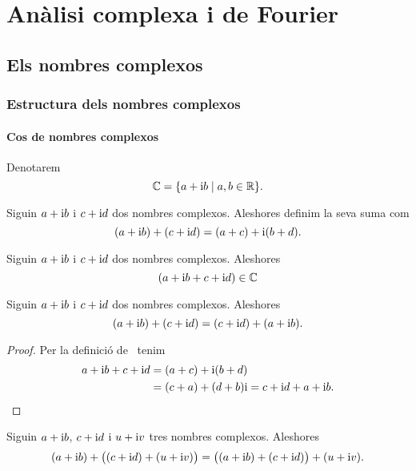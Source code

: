 \documentclass[../Apunts.tex]{subfiles}
\begin{document}
\part{Anàlisi complexa i de Fourier}
\chapter{Els nombres complexos}
\section{Estructura dels nombres complexos}
	\subsection{Cos de nombres complexos}
	\begin{notation}
		\label{notation:cos de nombres complexos}
		Denotarem
		\[\mathbb{C}=\{a+\mathrm{i} b\mid a,b\in\mathbb{R}\}.\]
	\end{notation}
	\begin{definition}
		\label{def:suma de nombres complexos}
		Siguin \(a+\mathrm{i} b\) i \(c+\mathrm{i} d\) dos nombres complexos. Aleshores definim la seva suma com
		\[(a+\mathrm{i} b)+(c+\mathrm{i} d)=(a+c)+\mathrm{i}(b+d).\]
	\end{definition}
	\begin{observation}
		\label{obs:els nombres complexos estan tancats per la suma}
		Siguin \(a+\mathrm{i} b\) i \(c+\mathrm{i} d\) dos nombres complexos. Aleshores
		\[(a+\mathrm{i} b+c+\mathrm{i} d)\in\mathbb{C}\]
	\end{observation}
	\begin{proposition}
		\label{prop:els nombres complexos commuten per la suma}
		\label{prop:el producte de nombres complexos és commutatiu}
		Siguin \(a+\mathrm{i} b\) i \(c+\mathrm{i} d\) dos nombres complexos. Aleshores
		\[(a+\mathrm{i} b)+(c+\mathrm{i} d)=(c+\mathrm{i} d)+(a+\mathrm{i} b).\]
	\end{proposition}
	\begin{proof}
		Per la definició de~ tenim
		\begin{align*}
			a+\mathrm{i} b+c+\mathrm{i} d&=(a+c)+\mathrm{i}(b+d) \\
			&=(c+a)+(d+b)\mathrm{i}=c+\mathrm{i} d+a+\mathrm{i} b.\qedhere
		\end{align*}
	\end{proof}
	\begin{proposition}
		\label{prop:els nombres complexos són associatius per la suma}
		Siguin \(a+\mathrm{i} b\), \(c+\mathrm{i} d\) i \(u+\mathrm{i} v\) tres nombres complexos. Aleshores
		\[(a+\mathrm{i} b)+\big((c+\mathrm{i} d)+(u+\mathrm{i} v)\big)=\big((a+\mathrm{i} b)+(c+\mathrm{i} d)\big)+(u+\mathrm{i} v).\]
	\end{proposition}
\end{document}
